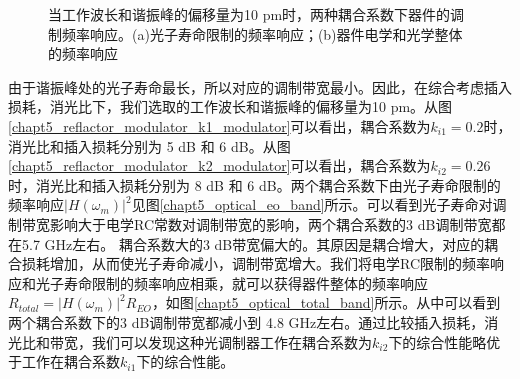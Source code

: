 \begin{figure}[htb]
	\small
	\caption{当工作波长和谐振峰的偏移量为10 pm时，两种耦合系数下器件的调制频率响应。(a)光子寿命限制的频率响应；(b)器件电学和光学整体的频率响应}
	\label{chapt5_optical_oe_total_band}	
\end{figure}
				
由于谐振峰处的光子寿命最长，所以对应的调制带宽最小。因此，在综合考虑插入损耗，消光比下，我们选取的工作波长和谐振峰的偏移量为10 pm。从图\ref{chapt5_reflactor_modulator_k1_modulator}可以看出，耦合系数为$k_{i1} = 0.2$时，消光比和插入损耗分别为 5 dB 和 6 dB。从图\ref{chapt5_reflactor_modulator_k2_modulator}可以看出，耦合系数为$k_{i2} = 0.26$时，消光比和插入损耗分别为 8 dB 和 6 dB。两个耦合系数下由光子寿命限制的频率响应$|H(\omega_m)|^2$见图\ref{chapt5_optical_eo_band}所示。可以看到光子寿命对调制带宽影响大于电学RC常数对调制带宽的影响，两个耦合系数的3 dB调制带宽都在5.7 GHz左右。 耦合系数大的3 dB带宽偏大的。其原因是耦合增大，对应的耦合损耗增加，从而使光子寿命减小，调制带宽增大。我们将电学RC限制的频率响应和光子寿命限制的频率响应相乘，就可以获得器件整体的频率响应$R_{total} = |H(\omega_m)|^2 R_{EO}$，如图\ref{chapt5_optical_total_band}所示。从中可以看到两个耦合系数下的3 dB调制带宽都减小到 4.8 GHz左右。通过比较插入损耗，消光比和带宽，我们可以发现这种光调制器工作在耦合系数为$k_{i2}$下的综合性能略优于工作在耦合系数$k_{i1}$下的综合性能。

